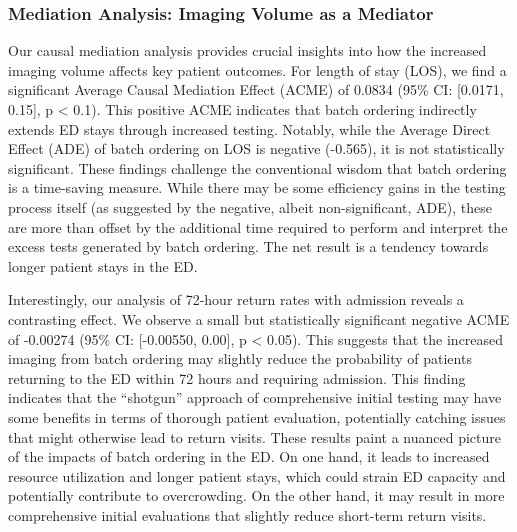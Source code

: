 \documentclass[,,nonblindrev]{informs}
\begin{document}
\hypertarget{mediation-analysis-imaging-volume-as-a-mediator}{%
\subsubsection{Mediation Analysis: Imaging Volume as a
Mediator}\label{mediation-analysis-imaging-volume-as-a-mediator}}

Our causal mediation analysis provides crucial insights into how the
increased imaging volume affects key patient outcomes. For length of
stay (LOS), we find a significant Average Causal Mediation Effect (ACME)
of 0.0834 (95\% CI: {[}0.0171, 0.15{]}, p \textless{} 0.1). This
positive ACME indicates that batch ordering indirectly extends ED stays
through increased testing. Notably, while the Average Direct Effect
(ADE) of batch ordering on LOS is negative (-0.565), it is not
statistically significant. These findings challenge the conventional
wisdom that batch ordering is a time-saving measure. While there may be
some efficiency gains in the testing process itself (as suggested by the
negative, albeit non-significant, ADE), these are more than offset by
the additional time required to perform and interpret the excess tests
generated by batch ordering. The net result is a tendency towards longer
patient stays in the ED.

Interestingly, our analysis of 72-hour return rates with admission
reveals a contrasting effect. We observe a small but statistically
significant negative ACME of -0.00274 (95\% CI: {[}-0.00550, 0.00{]}, p
\textless{} 0.05). This suggests that the increased imaging from batch
ordering may slightly reduce the probability of patients returning to
the ED within 72 hours and requiring admission. This finding indicates
that the ``shotgun'' approach of comprehensive initial testing may have
some benefits in terms of thorough patient evaluation, potentially
catching issues that might otherwise lead to return visits. These
results paint a nuanced picture of the impacts of batch ordering in the
ED. On one hand, it leads to increased resource utilization and longer
patient stays, which could strain ED capacity and potentially contribute
to overcrowding. On the other hand, it may result in more comprehensive
initial evaluations that slightly reduce short-term return visits.
\end{document}
